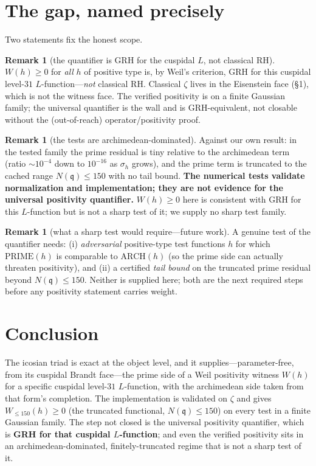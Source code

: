 \documentclass[11pt]{article}
\theoremstyle{definition}
\newtheorem{remark}[theorem]{Remark}
\newcommand{\fq}{\mathfrak{q}}
\newcommand{\Wtrunc}{W_{\le 150}}
\begin{document}
\section{The gap, named precisely}
Two statements fix the honest scope.

\begin{remark}[the quantifier is GRH for the cuspidal $L$, not classical RH]
$W(h)\ge 0$ for \emph{all} $h$ of positive type is, by Weil's criterion, GRH for this
cuspidal level-$31$ $L$-function---\emph{not} classical RH. Classical $\zeta$ lives in the
Eisenstein face (\S1), which is not the witness face. The verified positivity is on a
finite Gaussian family; the universal quantifier is the wall and is GRH-equivalent, not
closable without the (out-of-reach) operator/positivity proof.
\end{remark}

\begin{remark}[the tests are archimedean-dominated]
Against our own result: in the tested family the prime residual is tiny relative to the
archimedean term (ratio $\sim10^{-4}$ down to $10^{-16}$ as $\sigma_h$ grows), and the
prime term is truncated to the cached range $N(\fq)\le150$ with no tail bound.
\textbf{The numerical tests validate normalization and implementation; they are not
evidence for the universal positivity quantifier.} $W(h)\ge0$ here is consistent with
GRH for this $L$-function but is not a sharp test of it; we supply no sharp test family.
\end{remark}

\begin{remark}[what a sharp test would require---future work]\label{rem:future}
A genuine test of the quantifier needs: (i) \emph{adversarial} positive-type test
functions $h$ for which $\mathrm{PRIME}(h)$ is comparable to $\mathrm{ARCH}(h)$ (so the
prime side can actually threaten positivity), and (ii) a certified \emph{tail bound} on
the truncated prime residual beyond $N(\fq)\le150$. Neither is supplied here; both are
the next required steps before any positivity statement carries weight.
\end{remark}

\section{Conclusion}
The icosian triad is exact at the object level, and it supplies---parameter-free, from
its cuspidal Brandt face---the prime side of a Weil positivity witness $W(h)$ for a
specific cuspidal level-$31$ $L$-function, with the archimedean side taken from that
form's completion. The implementation is validated on $\zeta$ and gives
$\Wtrunc(h)\ge0$ (the truncated functional, $N(\fq)\le150$) on
every test in a finite Gaussian family. The step not closed is the universal positivity
quantifier, which is \textbf{GRH for that cuspidal $L$-function}; and even the verified
positivity sits in an archimedean-dominated, finitely-truncated regime that is not a
sharp test of it.
\end{document}

